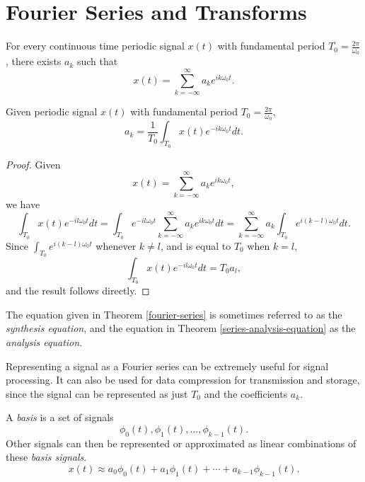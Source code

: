 \section{Fourier Series and Transforms}

\begin{thm}\label{fourier-series}
    For every continuous time periodic signal $x(t)$ with fundamental period $T_0 = \frac{2\pi}{\omega_0}$, there exists $a_k$ such that
    \[x(t) = \sum_{k=-\infty}^{\infty}a_ke^{ik\omega_0t}.\]
\end{thm}

\begin{thm}\label{series-analysis-equation}
    Given periodic signal $x(t)$ with fundamental period $T_0 = \frac{2\pi}{\omega_0}$,
    \[a_k = \frac{1}{T_0}\int_{T_0}x(t)e^{-ik\omega_0t}dt.\]
\end{thm}

\begin{proof}
    Given \[x(t) = \sum_{k=-\infty}^{\infty}a_ke^{ik\omega_0t},\]
    we have
    \[\int_{T_0}x(t)e^{-il\omega_0t}dt = \int_{T_0}e^{-il\omega_0t}\sum_{k=-\infty}^{\infty}a_ke^{ik\omega_0t}dt = \sum_{k=-\infty}^{\infty}a_k\int_{T_0}e^{i(k-l)\omega_0t}dt.\]
    Since $\int_{T_0}e^{i(k-l)\omega_0t}$ whenever $k \neq l$, and is equal to $T_0$ when $k = l$,
    \[\int_{T_0}x(t)e^{-il\omega_0t}dt = T_0a_l,\]
    and the result follows directly.
\end{proof}

\begin{rmk}
    The equation given in Theorem \ref{fourier-series} is sometimes referred to as the \emph{synthesis equation}, and the equation in Theorem \ref{series-analysis-equation} as the \emph{analysis equation}.
\end{rmk}

\begin{rmk}
    Representing a signal as a Fourier series can be extremely useful for signal processing. It can also be used for data compression for transmission and storage, since the signal can be represented as just $T_0$ and the coefficients $a_k$.
\end{rmk}

\begin{defn}
    A \emph{basis} is a set of signals
    \[\phi_0(t), \phi_1(t), \ldots, \phi_{k-1}(t).\]
    Other signals can then be represented or approximated as linear combinations of these \emph{basis signals}.
    \[x(t) \approx a_0\phi_0(t) + a_1\phi_1(t) + \cdots + a_{k-1}\phi_{k-1}(t).\]
\end{defn}

